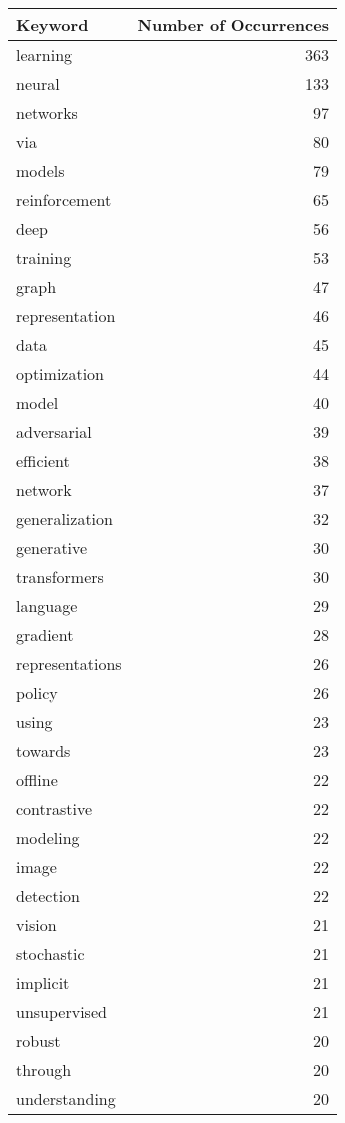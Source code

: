 \begin{table}[h]
\centering
\begin{tabular}{|l|r|}
\hline
Keyword & Number of Occurrences \\
\hline
learning & 363 \\
\hline
neural & 133 \\
\hline
networks & 97 \\
\hline
via & 80 \\
\hline
models & 79 \\
\hline
reinforcement & 65 \\
\hline
deep & 56 \\
\hline
training & 53 \\
\hline
graph & 47 \\
\hline
representation & 46 \\
\hline
data & 45 \\
\hline
optimization & 44 \\
\hline
model & 40 \\
\hline
adversarial & 39 \\
\hline
efficient & 38 \\
\hline
network & 37 \\
\hline
generalization & 32 \\
\hline
generative & 30 \\
\hline
transformers & 30 \\
\hline
language & 29 \\
\hline
gradient & 28 \\
\hline
representations & 26 \\
\hline
policy & 26 \\
\hline
using & 23 \\
\hline
towards & 23 \\
\hline
offline & 22 \\
\hline
contrastive & 22 \\
\hline
modeling & 22 \\
\hline
image & 22 \\
\hline
detection & 22 \\
\hline
vision & 21 \\
\hline
stochastic & 21 \\
\hline
implicit & 21 \\
\hline
unsupervised & 21 \\
\hline
robust & 20 \\
\hline
through & 20 \\
\hline
understanding & 20 \\
\hline

\end{tabular}
\end{table}

